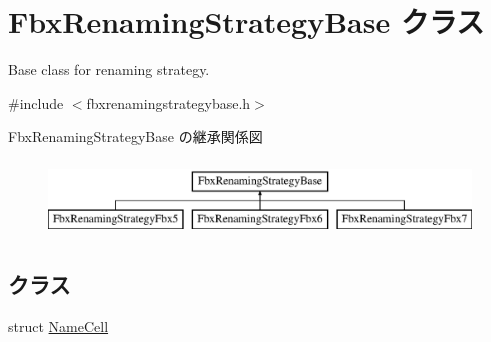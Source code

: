 \hypertarget{class_fbx_renaming_strategy_base}{}\section{Fbx\+Renaming\+Strategy\+Base クラス}
\label{class_fbx_renaming_strategy_base}


Base class for renaming strategy.  




{\ttfamily \#include $<$fbxrenamingstrategybase.\+h$>$}

Fbx\+Renaming\+Strategy\+Base の継承関係図\begin{figure}[H]
\begin{center}
\leavevmode
\includegraphics[height=2.000000cm]{class_fbx_renaming_strategy_base}
\end{center}
\end{figure}
\subsection*{クラス}
\begin{DoxyCompactItemize}
\item 
struct \hyperlink{struct_fbx_renaming_strategy_base_1_1_name_cell}{Name\+Cell}
\end{DoxyCompactItemize}
